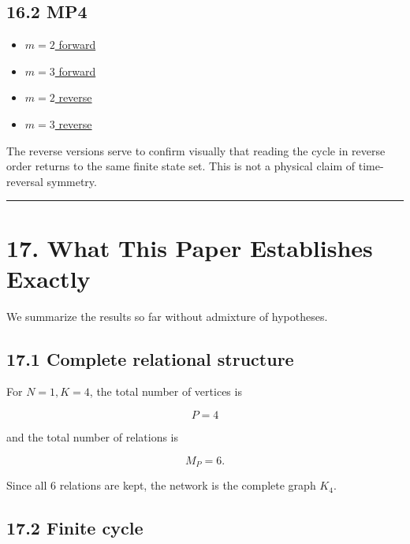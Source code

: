 \documentclass[
  a4paper,
]{article}
\providecommand{\tightlist}{%
  \setlength{\itemsep}{0pt}\setlength{\parskip}{0pt}}
\begin{document}
\subsection{16.2 MP4}\label{mp4}

\begin{itemize}
\tightlist
\item
  \href{K4_harmonic_discrete_phase_m2_20260915.mp4}{\(m=2\) forward}
\item
  \href{K4_harmonic_discrete_phase_m3_20260915.mp4}{\(m=3\) forward}
\item
  \href{K4_harmonic_discrete_phase_m2_reverse_20260915.mp4}{\(m=2\)
  reverse}
\item
  \href{K4_harmonic_discrete_phase_m3_reverse_20260915.mp4}{\(m=3\)
  reverse}
\end{itemize}

The reverse versions serve to confirm visually that reading the cycle in
reverse order returns to the same finite state set. This is not a
physical claim of time-reversal symmetry.

\begin{center}\rule{0.5\linewidth}{0.5pt}\end{center}

\section{17. What This Paper Establishes
Exactly}\label{what-this-paper-establishes-exactly}

We summarize the results so far without admixture of hypotheses.

\subsection{17.1 Complete relational
structure}\label{complete-relational-structure}

For \(N=1, K=4\), the total number of vertices is

\[
P=4
\]

and the total number of relations is

\[
M_P=6.
\]

Since all 6 relations are kept, the network is the complete graph
\(K_4\).

\subsection{17.2 Finite cycle}\label{finite-cycle}
\end{document}
